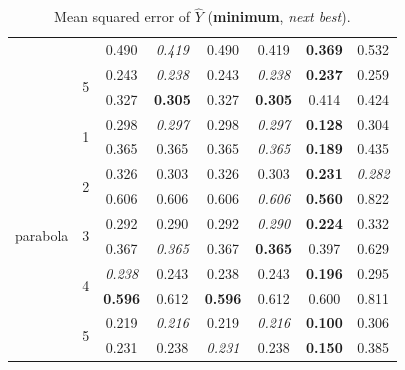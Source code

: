\documentclass[authoryear, review, 11pt]{elsarticle}
\begin{document}
\begin{table}
\begin{center}
\begin{tabular}{cccccccc}
   &  & 0.490 & \emph{0.419} & 0.490 & 0.419 & \textbf{0.369} & 0.532 \\ 
   \cline{3-8}
   & \multirow{2}{*}{5} & 0.243 & \emph{0.238} & 0.243 & \emph{0.238} & \textbf{0.237} & 0.259 \\ 
   &  & 0.327 & \textbf{0.305} & 0.327 & \textbf{0.305} & 0.414 & 0.424 \\ 
   \hline
  \multirow{10}{*}{parabola} & \multirow{2}{*}{1} & 0.298 & \emph{0.297} & 0.298 & \emph{0.297} & \textbf{0.128} & 0.304 \\ 
   &  & 0.365 & 0.365 & 0.365 & \emph{0.365} & \textbf{0.189} & 0.435 \\ 
   \cline{3-8}
   & \multirow{2}{*}{2} & 0.326 & 0.303 & 0.326 & 0.303 & \textbf{0.231} & \emph{0.282} \\ 
   &  & 0.606 & 0.606 & 0.606 & \emph{0.606} & \textbf{0.560} & 0.822 \\ 
   \cline{3-8}
   & \multirow{2}{*}{3} & 0.292 & 0.290 & 0.292 & \emph{0.290} & \textbf{0.224} & 0.332 \\ 
   &  & 0.367 & \emph{0.365} & 0.367 & \textbf{0.365} & 0.397 & 0.629 \\ 
   \cline{3-8}
   & \multirow{2}{*}{4} & \emph{0.238} & 0.243 & 0.238 & 0.243 & \textbf{0.196} & 0.295 \\ 
   &  & \textbf{0.596} & 0.612 & \textbf{0.596} & 0.612 & 0.600 & 0.811 \\ 
   \cline{3-8}
   & \multirow{2}{*}{5} & 0.219 & \emph{0.216} & 0.219 & \emph{0.216} & \textbf{0.100} & 0.306 \\ 
   &  & 0.231 & 0.238 & \emph{0.231} & 0.238 & \textbf{0.150} & 0.385 \\ 
  \end{tabular}
\caption{Mean squared error of $\hat{Y}$ (\textbf{minimum}, \emph{next best}).\label{table:Y-mse}}
\end{center}
\end{table}
\end{document}
